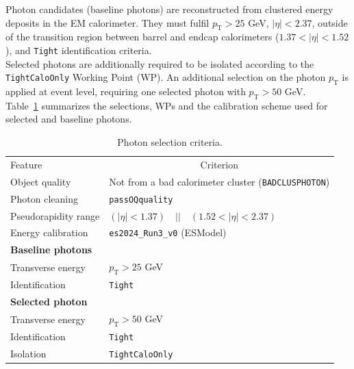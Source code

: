 Photon candidates (baseline photons) are reconstructed from clustered energy deposits in the EM calorimeter. They must
fulfil $p_{\mathrm{T}}>25$ GeV, $|\eta|<2.37$, outside of the transition region between barrel and endcap calorimeters ($1.37< |\eta| < 1.52$), and \texttt{Tight} identification criteria. \\
Selected photons are additionally required to be isolated according to the \texttt{TightCaloOnly} Working Point (WP). An additional selection on the photon $p_{\mathrm{T}}$ is applied at event level, requiring one selected photon with $p_{\mathrm{T}}>50$ GeV. \\
Table~\ref{tab:object:photon} summarizes the selections, WPs and the calibration scheme used for selected and baseline photons. 

\begin{table}[ht]
  \caption{Photon selection criteria.}%
  \label{tab:object:photon} 
  \centering
  \begin{tabular}{ll}
    \toprule
    Feature & \multicolumn{1}{c}{Criterion} \\
    Object quality & Not from a bad calorimeter cluster (\texttt{BADCLUSPHOTON})\\ %
    Photon cleaning & \texttt{passOQquality} \\
    Pseudorapidity range & $(|\eta| < 1.37) \quad || \quad (1.52 < |\eta| < 2.37)$ \\
    Energy calibration & \texttt{es2024\_Run3\_v0} (ESModel)\\
    \midrule\midrule
    \textbf{Baseline photons} &\\ 
    \midrule
    Transverse energy & $p_{\mathrm{T}}>25$ GeV \\
    Identification & \texttt{Tight} \\
    \midrule
    \textbf{Selected photon} &\\ 
    \midrule
    Transverse energy & $p_{\mathrm{T}}>50$ GeV \\
    Identification & \texttt{Tight} \\
    Isolation &  \texttt{TightCaloOnly} \\
    \bottomrule
  \end{tabular}
\end{table}